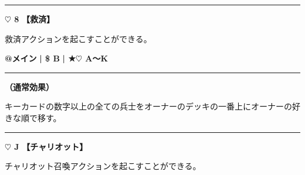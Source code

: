 \documentclass[twocolumn,a5paper,papersize,10pt]{jarticle}
\begin{document}
\vspace{3mm} %
\hrule height 0.5mm depth 0mm width 66.5mm %
\vspace{1mm} %
{\Large\bf $\heartsuit$ 8} {\normalsize\bf【救済】} %
\vspace{1mm} %

救済アクションを起こすことができる。

\begin{tcolorbox}[title={\small\bf【Action】救済}{\scriptsize （通常魔法）}]

{\scriptsize\bf @メイン }
  {\scriptsize\bf | \$ B }
  {\scriptsize\bf | ★{\normalsize $\heartsuit$} A〜K}

\vspace{1mm} %
\hrule height 0.1mm depth 0mm width 62mm %
\vspace{1mm} %

{\bf（通常効果）}

キーカードの数字以上の全ての兵士をオーナーのデッキの一番上にオーナーの好きな順で移す。

\vspace{1mm} %
\end{tcolorbox}

\vspace{-1zh}

 
 
 
 
 

\vspace{3mm} %
\hrule height 0.5mm depth 0mm width 66.5mm %
\vspace{1mm} %
{\Large\bf $\heartsuit$ J} {\normalsize\bf【チャリオット】} %
\vspace{1mm} %

チャリオット召喚アクションを起こすことができる。
\end{document}
